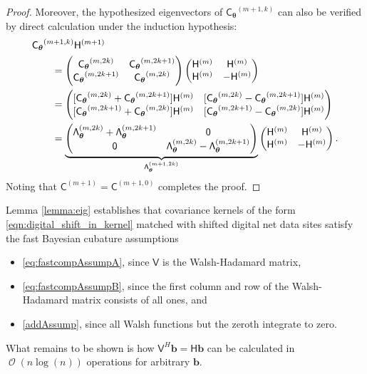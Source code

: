 \documentclass[graybox,footinfo]{svmult}
\DeclareMathOperator{\Order}{{\mathcal O}}
\newcommand{\bm}[1]{\boldsymbol{#1}}
\newcommand{\vtheta}{{\bm{\theta}}}
\newcommand{\vb}{\bm{b}}
\newcommand{\mC}{\mathsf{C}}
\newcommand{\mCtheta}{{\mathsf{C}_{\vtheta}}}
\newcommand{\mLambda}{\mathsf{\Lambda}}
\newcommand{\mH}{\mathsf{H}}
\newcommand{\mV}{\mathsf{V}}
\begin{document}
\begin{proof}
    Moreover, the hypothesized eigenvectors of $\mCtheta^{(m+1,k)}$ can also be verified by direct calculation under the induction hypothesis:
     \begin{align*}
        \MoveEqLeft{\mCtheta^{(m+1,k)} \mH^{(m+1)}} \\
        & =  
        \begin{pmatrix} \mCtheta^{(m,2k)} & \mCtheta^{(m,2k+1)} \\
        \mCtheta^{(m,2k+1)} & \mCtheta^{(m,2k)}
        \end{pmatrix} 
        \begin{pmatrix}
        \mH^{(m)} &   \mH^{(m)} \\
         \mH^{(m)} & - \mH^{(m)}
        \end{pmatrix}\\
        & = 
    \begin{pmatrix}
        [\mCtheta^{(m,2k)} + \mCtheta^{(m,2k+1)}] \mH^{(m)} & [\mCtheta^{(m,2k)} - \mCtheta^{(m,2k+1)}] \mH^{(m)}\\
        [\mCtheta^{(m,2k+1)} + \mCtheta^{(m,2k)}] \mH^{(m)} &   [\mCtheta^{(m,2k+1)} - \mCtheta^{(m,2k)}] \mH^{(m)}
        \end{pmatrix} \\
        & = \underbrace{\begin{pmatrix}
        \mLambda_\vtheta^{(m,2k)} + \mLambda_\vtheta^{(m,2k+1)}  & \mathsf{0}\\
        \mathsf{0} &   \mLambda_\vtheta^{(m,2k)} - \mLambda_\vtheta^{(m,2k+1)}
        \end{pmatrix}}_{\mLambda_\vtheta^{(m+1,2k)}} 
        \begin{pmatrix}
        \mH^{(m)} & \mH^{(m)} \\ \mH^{(m)} & -\mH^{(m)}
        \end{pmatrix}.
    \end{align*}
Noting that $\mC^{(m+1)} = \mC^{(m+1,0)} $ completes the proof.
\end{proof}

Lemma \ref{lemma:eig} establishes that covariance kernels of the form \eqref{eqn:digital_shift_in_kernel} matched with shifted digital net data sites satisfy the fast Bayesian cubature assumptions
\begin{itemize}
    \item \eqref{eq:fastcompAssumpA}, since $\mV$ is the Walsh-Hadamard matrix,
    
    \item  \eqref{eq:fastcompAssumpB}, since the first column and row of the  Walsh-Hadamard matrix consists of all ones, and
    
    \item \eqref{addAssump}, since all Walsh functions but the zeroth integrate to zero.
\end{itemize}
What remains to be shown is how $\mV^H \vb = \mH \vb$ can be calculated in $\Order(n \log(n))$ operations for arbitrary $\vb$.
\end{document}

